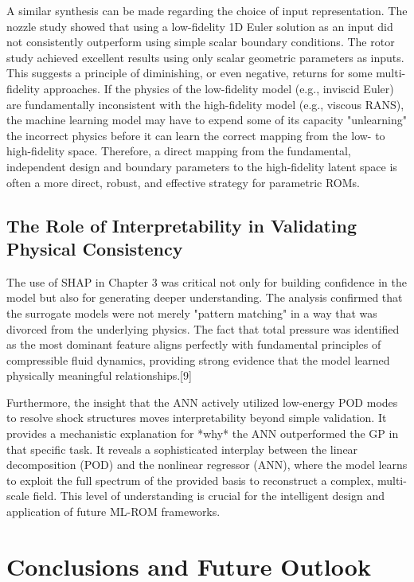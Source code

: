 \documentclass[12pt, a4paper]{report}
\begin{document}
A similar synthesis can be made regarding the choice of input representation. The nozzle study showed that using a low-fidelity 1D Euler solution as an input did not consistently outperform using simple scalar boundary conditions. The rotor study achieved excellent results using only scalar geometric parameters as inputs. This suggests a principle of diminishing, or even negative, returns for some multi-fidelity approaches. If the physics of the low-fidelity model (e.g., inviscid Euler) are fundamentally inconsistent with the high-fidelity model (e.g., viscous RANS), the machine learning model may have to expend some of its capacity "unlearning" the incorrect physics before it can learn the correct mapping from the low- to high-fidelity space. Therefore, a direct mapping from the fundamental, independent design and boundary parameters to the high-fidelity latent space is often a more direct, robust, and effective strategy for parametric ROMs.

\section{The Role of Interpretability in Validating Physical Consistency}
The use of SHAP in Chapter 3 was critical not only for building confidence in the model but also for generating deeper understanding. The analysis confirmed that the surrogate models were not merely "pattern matching" in a way that was divorced from the underlying physics. The fact that total pressure was identified as the most dominant feature aligns perfectly with fundamental principles of compressible fluid dynamics, providing strong evidence that the model learned physically meaningful relationships.[9]

Furthermore, the insight that the ANN actively utilized low-energy POD modes to resolve shock structures moves interpretability beyond simple validation. It provides a mechanistic explanation for *why* the ANN outperformed the GP in that specific task. It reveals a sophisticated interplay between the linear decomposition (POD) and the nonlinear regressor (ANN), where the model learns to exploit the full spectrum of the provided basis to reconstruct a complex, multi-scale field. This level of understanding is crucial for the intelligent design and application of future ML-ROM frameworks.

\chapter{Conclusions and Future Outlook}
\end{document}
